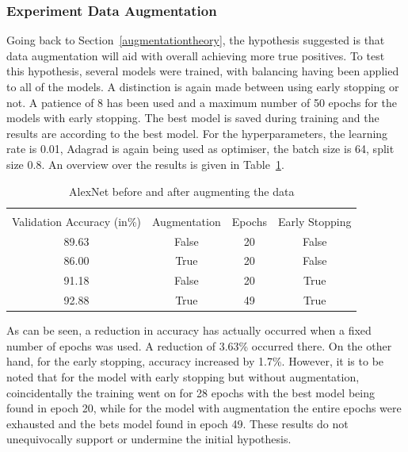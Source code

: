 \subsubsection{Experiment Data Augmentation}
Going back to Section~\ref{augmentationtheory}, the hypothesis suggested is that data augmentation will aid with overall achieving more true positives. To test this hypothesis, several models were trained, with balancing having  been applied to all of the models. A distinction is again made between using early stopping or not. A patience of 8 has been used and a maximum number of 50 epochs for the models with early stopping. The best model is saved during training and the results are according to the best model. For the hyperparameters, the learning rate is 0.01, Adagrad is again being used as optimiser, the batch size is 64, split size 0.8. An overview over the results is given in Table~\ref{augmentation-table}. 
\begin{table}[ht]
	\caption{AlexNet before and after augmenting the data}\label{augmentation-table}
	\centering
	\begin{tabular}{cccc}
		\toprule
		\multicolumn{3}{c}{} \\
		Validation Accuracy (in\%)     & Augmentation    &     Epochs    &Early Stopping  \\
		\midrule
		89.63    &    False    &    20    &    False  \\
		86.00   &    True    &    20    &    False  \\
		91.18    &    False    &    20    &    True  \\
		92.88    &    True    &    49    &    True  \\
		\bottomrule
	\end{tabular}
\end{table}
As can be seen, a reduction in accuracy has actually occurred when a fixed number of epochs was used. A reduction of 3.63\% occurred there. On the other hand, for the early stopping, accuracy increased by 1.7\%. However, it is to be noted that for the model with early stopping but without augmentation, coincidentally the training went on for 28 epochs with the best model being found in epoch 20, while for the model with augmentation the entire epochs were exhausted and the bets model found in epoch 49. These results do not unequivocally support or undermine the initial hypothesis.

